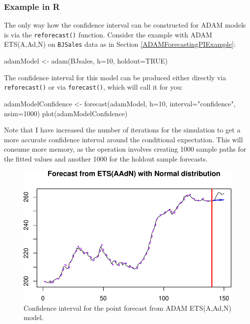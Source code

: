 \documentclass[
]{book}
\newenvironment{Shaded}{\begin{snugshade}}{\end{snugshade}}
\newcommand{\AttributeTok}[1]{\textcolor[rgb]{0.77,0.63,0.00}{#1}}
\newcommand{\ConstantTok}[1]{\textcolor[rgb]{0.00,0.00,0.00}{#1}}
\newcommand{\DecValTok}[1]{\textcolor[rgb]{0.00,0.00,0.81}{#1}}
\newcommand{\FunctionTok}[1]{\textcolor[rgb]{0.00,0.00,0.00}{#1}}
\newcommand{\NormalTok}[1]{#1}
\newcommand{\OtherTok}[1]{\textcolor[rgb]{0.56,0.35,0.01}{#1}}
\newcommand{\StringTok}[1]{\textcolor[rgb]{0.31,0.60,0.02}{#1}}
\theoremstyle{definition}
\theoremstyle{definition}
\theoremstyle{definition}
\theoremstyle{definition}
\theoremstyle{remark}
\begin{document}
\hypertarget{example-in-r-1}{%
\subsubsection{Example in R}\label{example-in-r-1}}

The only way how the confidence interval can be constructed for ADAM models is via the \texttt{reforecast()} function. Consider the example with ADAM ETS(A,Ad,N) on \texttt{BJSales} data as in Section \ref{ADAMForecastingPIExample}:

\begin{Shaded}
\begin{Highlighting}[]
\NormalTok{adamModel }\OtherTok{\textless{}{-}} \FunctionTok{adam}\NormalTok{(BJsales, }\AttributeTok{h=}\DecValTok{10}\NormalTok{, }\AttributeTok{holdout=}\ConstantTok{TRUE}\NormalTok{)}
\end{Highlighting}
\end{Shaded}

The confidence interval for this model can be produced either directly via \texttt{reforecast()} or via \texttt{forecast()}, which will call it for you:

\begin{Shaded}
\begin{Highlighting}[]
\NormalTok{adamModelConfidence }\OtherTok{\textless{}{-}} \FunctionTok{forecast}\NormalTok{(adamModel, }\AttributeTok{h=}\DecValTok{10}\NormalTok{,}
                                \AttributeTok{interval=}\StringTok{"confidence"}\NormalTok{, }\AttributeTok{nsim=}\DecValTok{1000}\NormalTok{)}
\FunctionTok{plot}\NormalTok{(adamModelConfidence)}
\end{Highlighting}
\end{Shaded}

Note that I have increased the number of iterations for the simulation to get a more accurate confidence interval around the conditional expectation. This will consume more memory, as the operation involves creating 1000 sample paths for the fitted values and another 1000 for the holdout sample forecasts.

\begin{figure}
\centering
\includegraphics{Svetunkov--2022----ADAM_files/figure-latex/adamModelConfidence-1.pdf}
\caption{\label{fig:adamModelConfidence}Confidence interval for the point forecast from ADAM ETS(A,Ad,N) model.}
\end{figure}
\end{document}
